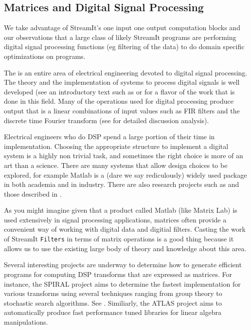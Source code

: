 \subsection{Matrices and Digital Signal Processing}
We take advantage of StreamIt's one input one output computation blocks and 
our observations that a large class of likely StreamIt programs are performing
digital signal processing functions (eg filtering of the data) to do domain specific
optimizations on programs.

The is an entire area of electrical engineering devoted to digital signal processing. The
theory and the implementation of systems to process digital signals is well developed (see
an introductory text such as\cite{oppenheim-discrete} or \cite{lyons-understanding} for 
a flavor of the work that is done in this field. Many of the operations used for digital 
processing produce output that is a linear combinations of input values such as FIR filters and
the discrete time Fourier transform (see \cite{oppenheim-discrete} for detailed discussion
analysis).

Electrical engineers who do DSP spend a large portion of their time in implementation. Choosing
the appropriate structure to implement a digital system is a highly non trivial task, and sometimes
the right choice is more of an art than a science. There are many systems that allow design choices
to be explored, for example Matlab\cite{matlab} is a (dare we say rediculously) widely used package 
in both academia and in industry. There are also research projects such as \cite{covell-ade} 
and those described in \cite{oppenheim-symbolic}. 

As you might imagine given that a product called Matlab (like Matrix Lab) is used extensively
in signal processing applications, matrices often provide a convenient way of working with
digital data and digitial filters. Casting the work of StreamIt {\tt Filters} in terms 
of matrix operations is a good thing because it allows us to use the existing large body
of theory and knowledge about this area. 

Several interesting projects are underway to determine how to generate efficient programs
for computing DSP transforms that are expressed as matrices. For instance, the SPIRAL
project\cite{spiral} aims to determine the fastest implementation for various transforms
using several techniques ranging from group theory to stochastic search algorithms. See
 \cite{xiong-thesis,xiong01spl,johnson01searching,egner01automatic}.
Similiarly, the ATLAS project \cite{whaley01automated} aims to automatically produce fast
performance tuned libraries for linear algebra manipulations.
